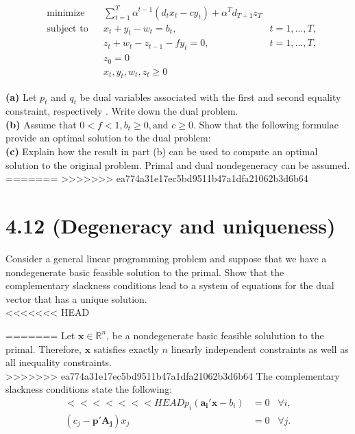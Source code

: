 \documentclass{article}
\begin{document}
\begin{equation*}
\begin{aligned}
& \text{minimize} && \displaystyle \sum_{t=1}^T \alpha^{t-1} (d_t x_t - c y_t) + \alpha^T d_{T+1} z_T\\
& \text{subject to} && x_t + y_t - w_t = b_t, \; & t = 1, \dots, T, \\
&&& z_t + w_t - z_{t-1} - fy_t = 0, & t = 1, \dots, T, \\
&&& z_0 = 0 \\
&&& x_t, y_t, w_t, z_t \geq 0
\end{aligned}
\end{equation*}

\noindent \textbf{(a)} Let $p_t$ and $q_t$ be dual variables associated with the first and second equality constraint, respectively .  Write down the dual problem. \\

\noindent \textbf{(b)} Assume that $ 0 < f < 1, b_t \geq 0, \text{and } c \geq 0$.  Show that the following formulae provide an optimal solution to the dual problem: \\

\noindent \textbf{(c)} Explain how the result in part (b) can be used to compute an optimal solution to the original problem.  Primal and dual nondegeneracy can be assumed. \\


=======
>>>>>>> ea774a31e17ec5bd9511b47a1dfa21062b3d6b64
\section*{4.12 (Degeneracy and uniqueness)}
Consider a general linear programming problem and suppose that we have a nondegenerate basic feasible solution to the primal.  Show that the complementary slackness conditions lead to a system of equations for the dual vector that has a unique solution.\\

\noindent
<<<<<<< HEAD

=======
Let $\mathbf{x} \in \mathbb{R}^n$, be a nondegenerate basic feasible solulution to the primal.  Therefore, $\mathbf{x}$ satisfies exactly $n$ linearly independent constraints as well as all inequality constraints.\\
>>>>>>> ea774a31e17ec5bd9511b47a1dfa21062b3d6b64
The complementary slackness conditions state the following:\\

\begin{equation*}
\begin{aligned}
<<<<<<< HEAD
p_i (\mathbf{a_i'x} - b_i) & = 0 \; \; \; \forall i, \\
(c_j - \mathbf{p' A_j}) x_j & = 0 \; \; \; \forall j.
\end{aligned}
\end{equation*}
\end{document}
